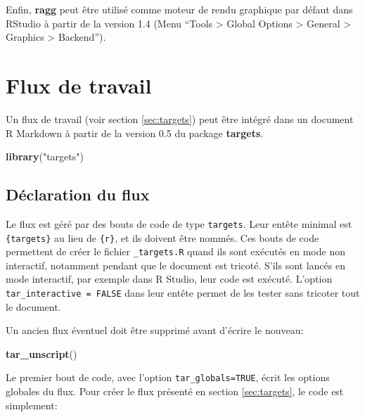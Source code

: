 \documentclass[
  12pt,
  french,
  a4paper,
  extrafontsizes,onecolumn,openright
  ]{memoir}
\newenvironment{Shaded}{\begin{snugshade}}{\end{snugshade}}
\newcommand{\FunctionTok}[1]{\textcolor[rgb]{0.13,0.29,0.53}{\textbf{#1}}}
\newcommand{\NormalTok}[1]{#1}
\newcommand{\StringTok}[1]{\textcolor[rgb]{0.31,0.60,0.02}{#1}}
\begin{document}
\normalsize

Enfin, \textbf{ragg} peut être utilisé comme moteur de rendu graphique par défaut dans RStudio à partir de la version 1.4 (Menu \enquote{Tools \textgreater{} Global Options \textgreater{} General \textgreater{} Graphics \textgreater{} Backend}).

\section{Flux de travail}\label{sec:targetsmd}

Un flux de travail (voir section \ref{sec:targets}) peut être intégré dans un document R Markdown à partir de la version 0.5 du package \textbf{targets}.

\scriptsize

\begin{Shaded}
\begin{Highlighting}[]
\FunctionTok{library}\NormalTok{(}\StringTok{"targets"}\NormalTok{)}
\end{Highlighting}
\end{Shaded}

\normalsize

\subsection{Déclaration du flux}\label{duxe9claration-du-flux}

Le flux est géré par des bouts de code de type \texttt{targets}.
Leur entête minimal est \texttt{\{targets\}} au lieu de \texttt{\{r\}}, et ils doivent être nommés.
Ces bouts de code permettent de créer le fichier \texttt{\_targets.R} quand ils sont exécutés en mode non interactif, notamment pendant que le document est tricoté.
S'ils sont lancés en mode interactif, par exemple dans R Studio, leur code est exécuté.
L'option \texttt{tar\_interactive\ =\ FALSE} dans leur entête permet de les tester sans tricoter tout le document.

Un ancien flux éventuel doit être supprimé avant d'écrire le nouveau:

\scriptsize

\begin{Shaded}
\begin{Highlighting}[]
\FunctionTok{tar\_unscript}\NormalTok{()}
\end{Highlighting}
\end{Shaded}

\normalsize

Le premier bout de code, avec l'option \texttt{tar\_globals=TRUE}, écrit les options globales du flux.
Pour créer le flux présenté en section \ref{sec:targets}, le code est simplement:
\end{document}
